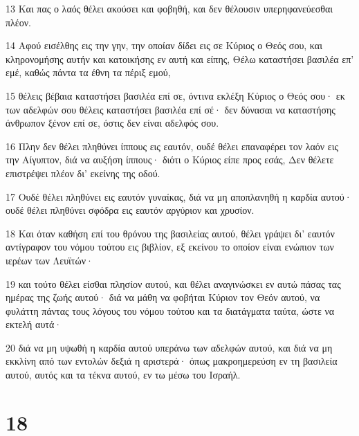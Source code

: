 \par 13 Και πας ο λαός θέλει ακούσει και φοβηθή, και δεν θέλουσιν υπερηφανεύεσθαι πλέον.
\par 14 Αφού εισέλθης εις την γην, την οποίαν δίδει εις σε Κύριος ο Θεός σου, και κληρονομήσης αυτήν και κατοικήσης εν αυτή και είπης, Θέλω καταστήσει βασιλέα επ' εμέ, καθώς πάντα τα έθνη τα πέριξ εμού,
\par 15 θέλεις βέβαια καταστήσει βασιλέα επί σε, όντινα εκλέξη Κύριος ο Θεός σου· εκ των αδελφών σου θέλεις καταστήσει βασιλέα επί σέ· δεν δύνασαι να καταστήσης άνθρωπον ξένον επί σε, όστις δεν είναι αδελφός σου.
\par 16 Πλην δεν θέλει πληθύνει ίππους εις εαυτόν, ουδέ θέλει επαναφέρει τον λαόν εις την Αίγυπτον, διά να αυξήση ίππους· διότι ο Κύριος είπε προς εσάς, Δεν θέλετε επιστρέψει πλέον δι' εκείνης της οδού.
\par 17 Ουδέ θέλει πληθύνει εις εαυτόν γυναίκας, διά να μη αποπλανηθή η καρδία αυτού· ουδέ θέλει πληθύνει σφόδρα εις εαυτόν αργύριον και χρυσίον.
\par 18 Και όταν καθήση επί του θρόνου της βασιλείας αυτού, θέλει γράψει δι' εαυτόν αντίγραφον του νόμου τούτου εις βιβλίον, εξ εκείνου το οποίον είναι ενώπιον των ιερέων των Λευϊτών·
\par 19 και τούτο θέλει είσθαι πλησίον αυτού, και θέλει αναγινώσκει εν αυτώ πάσας τας ημέρας της ζωής αυτού· διά να μάθη να φοβήται Κύριον τον Θεόν αυτού, να φυλάττη πάντας τους λόγους του νόμου τούτου και τα διατάγματα ταύτα, ώστε να εκτελή αυτά·
\par 20 διά να μη υψωθή η καρδία αυτού υπεράνω των αδελφών αυτού, και διά να μη εκκλίνη από των εντολών δεξιά η αριστερά· όπως μακροημερεύση εν τη βασιλεία αυτού, αυτός και τα τέκνα αυτού, εν τω μέσω του Ισραήλ.

\chapter{18}


